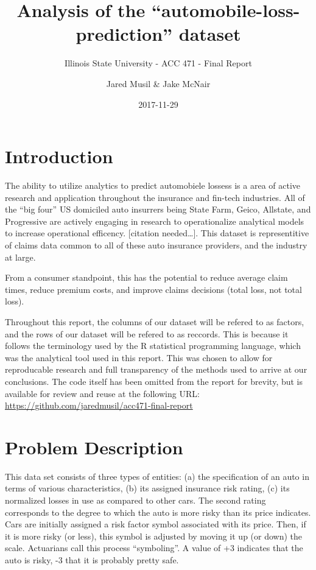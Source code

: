 \documentclass[12pt,openany]{book}
\title{Analysis of the ``automobile-loss-prediction'' dataset}
\subtitle{Illinois State University - ACC 471 - Final Report}
\author{Jared Musil \& Jake McNair}
\date{2017-11-29}
\begin{document}
\maketitle

{
\setcounter{tocdepth}{1}
\tableofcontents
}
\chapter{Introduction}\label{intro}

The ability to utilize analytics to predict automobiele lossess is a
area of active research and application throughout the insurance and
fin-tech industries. All of the ``big four'' US domiciled auto insurrers
being State Farm, Geico, Allstate, and Progressive are actively engaging
in research to operationalize analytical models to increase operational
efficency. {[}citation needed\ldots{}{]}. This dataset is representitive
of claims data common to all of these auto insurance providers, and the
industry at large.

From a consumer standpoint, this has the potential to reduce average
claim times, reduce premium costs, and improve claims decisions (total
loss, not total loss).

Throughout this report, the columns of our dataset will be refered to as
factors, and the rows of our dataset will be refered to as reccords.
This is because it follows the terminology used by the R statistical
programming language, which was the analytical tool used in this report.
This was chosen to allow for reproducable research and full transparency
of the methods used to arrive at our conclusions. The code itself has
been omitted from the report for brevity, but is available for review
and reuse at the following URL:
\url{https://github.com/jaredmusil/acc471-final-report}

\chapter{Problem Description}\label{problem-description}

This data set consists of three types of entities: (a) the specification
of an auto in terms of various characteristics, (b) its assigned
insurance risk rating, (c) its normalized losses in use as compared to
other cars. The second rating corresponds to the degree to which the
auto is more risky than its price indicates. Cars are initially assigned
a risk factor symbol associated with its price. Then, if it is more
risky (or less), this symbol is adjusted by moving it up (or down) the
scale. Actuarians call this process ``symboling''. A value of +3
indicates that the auto is risky, -3 that it is probably pretty safe.
\end{document}
